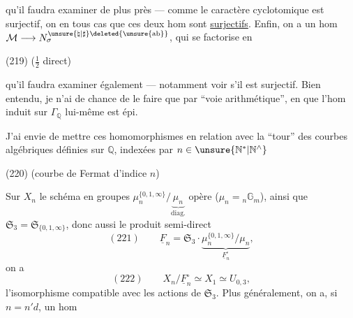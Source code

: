 qu'il faudra examiner de plus près --- comme le caractère cyclotomique est  surjectif, on  en tous cas que ces deux hom sont \uline{surjectifs}. Enfin, on a un hom
$\mathcal M\longrightarrow N_{\sigma}^{\unsure{\natural|\sharp}\deleted{\unsure{\mathrm{ab}}}}$, qui se factorise en

\noindent (219)\quad
{}
\hfill ($\frac12$ direct)

qu'il faudra examiner également --- notamment voir s'il est surjectif.
Bien entendu, je n'ai de chance de le faire que par ``voie arithmétique'', en  que l'hom induit sur $\Gamma_{\mathbb Q}$ lui-même est épi.


J'ai envie de mettre ces homomorphismes en relation avec la ``tour'' des courbes algébriques définies sur $\mathbb Q$, indexées par $n\in\unsure{\mathbb N^{*}|\mathbb N^{\wedge}}$

\noindent (220)\quad
{}
\hfill (courbe de Fermat d'indice $n$)


Sur $X_n$ le schéma en groupes $\mu_n^{\{0,1,\infty\}}/\underbrace{\mu_n}_{\mathrm{diag}.}$ opère ($\mu_n={}_n\mathbb G_m$),  ainsi que $\mathfrak S_3=\mathfrak S_{\{0,1,\infty\}}$, donc aussi le produit semi-direct
\[
(221)\qquad \underline F_n=\mathfrak S_3\mathbin{\cdot}\underbrace{\mu_n^{\{0,1,\infty\}}/\mu_n}_{\underline F_n^{\circ}},
\]
on a
\[
(222)\qquad X_n/\underline F_n^{\circ}\simeq X_1\simeq U_{0,3},
\]
l'isomorphisme compatible avec les actions de $\mathfrak S_3$. Plus généralement, on a, si $n=n'd$, un hom

